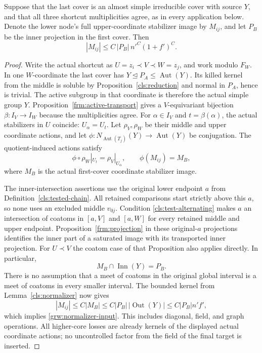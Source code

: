 \begin{lemma}\label{grw:input-normalizers}
Suppose that the last cover is an almost simple irreducible cover with
source $Y$, and that all three shortcut multiplicities agree, as in
every application below.  Denote the lower node's full upper-coordinate
stabilizer image by $M_{ij}$, and let $P_B$ be the inner projection in
the first cover.  Then
\begin{equation}\label{grw:normalizer-input}
 |M_{ij}|\le C\,|P_B|\,n'^{C}(1+f')^{C}.
\end{equation}
\end{lemma}
\begin{proof}
 Write the actual shortcut as
$U=z_i\prec V\prec W=z_j$, and work modulo $F_W$.
In one $W$-coordinate the last cover has
$Y\trianglelefteq P_A\le\operatorname{Aut}(Y)$.  Its killed kernel
from the middle is soluble by Proposition~\ref{cls:reduction} and
normal in $P_A$, hence is trivial.  The active subgroup in that
coordinate is therefore the actual simple group $Y$.
Proposition~\ref{frm:active-transport} gives a $V$-equivariant bijection
$\beta:I_V\longrightarrow I_W$ because the multiplicities agree.
For $\alpha\in I_V$ and $t=\beta(\alpha)$, the actual stabilizers in
$U$ coincide: $U_\alpha=U_t$.  Let $\rho_V,\rho_W$ be their middle
and upper coordinate actions, and let
$\phi:N_{\operatorname{Aut}(T_j)}(Y)\longrightarrow\operatorname{Aut}(Y)$
be conjugation.  The quotient-induced actions satisfy
\[
 \phi\circ\rho_W|_{U_t}=\rho_V|_{U_\alpha},
 \qquad \phi(M_{ij})=M_B,
\]
where $M_B$ is the actual first-cover coordinate stabilizer image.

The inner-intersection assertions use the original lower endpoint $a$
from Definition~\ref{cls:tested-chain}.  All retained comparisons
start strictly above this $a$, so none uses an excluded middle
$v_{0j}$.  Condition
\ref{cls:test-alternating} makes $a$ an intersection of coatoms in
$[a,V]$ and $[a,W]$ for every retained middle and upper endpoint.
Proposition~\ref{frm:projection} in these original-$a$ projections
identifies the inner part of a saturated image with its transported
inner projection.  For $U\prec V$ the coatom case of that Proposition
also applies directly.  In particular,
\[
 M_B\cap\operatorname{Inn}(Y)=P_B.
\]
There is no assumption that a meet of coatoms in the original global
interval is a meet of coatoms in every smaller interval.
The bounded kernel from Lemma~\ref{cls:normalizer} now gives
\[
 |M_{ij}|\le C|M_B|
 \le C|P_B|\,|\operatorname{Out}(Y)|
 \le C|P_B|n'f',
\]
which implies \eqref{grw:normalizer-input}.  This includes diagonal,
field, and graph operations.  All higher-core losses are already
kernels of the displayed actual coordinate actions; no uncontrolled
factor from the field of the final target is inserted.
\end{proof}

